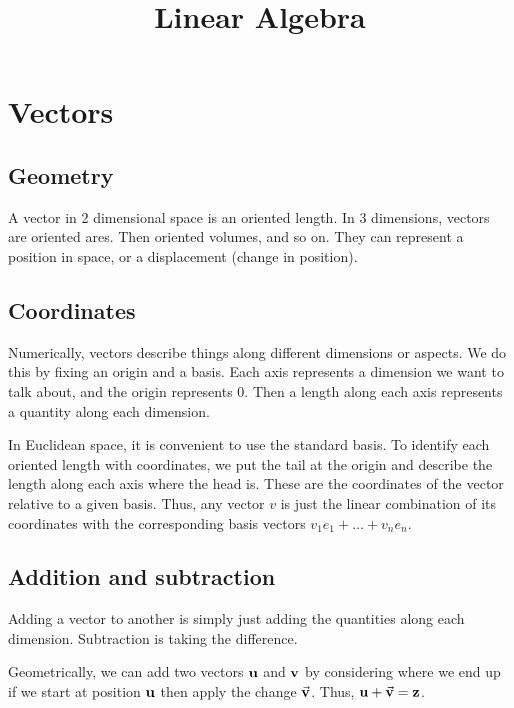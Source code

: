 \documentclass[../main.tex]{subfiles}
\title{Linear Algebra}
\author{}
\date{}
\begin{document}
\maketitle
\tableofcontents

\newpage

\section{Vectors}

\subsection{Geometry}

A vector in 2 dimensional space is an oriented length.
In 3 dimensions, vectors are oriented ares.
Then oriented volumes, and so on.
They can represent a position in space, or a displacement (change in position).

\subsection{Coordinates}

Numerically, vectors describe things along different dimensions or aspects.
We do this by fixing an origin and a basis.
Each axis represents a dimension we want to talk about,
and the origin represents 0.
Then a length along each axis represents a quantity along each dimension.

In Euclidean space, it is convenient to use the standard basis.
To identify each oriented length with coordinates,
we put the tail at the origin and describe the length along each axis where the head is.
These are the coordinates of the vector relative to a given basis.
Thus,
any vector \( v \) is just the linear combination of its coordinates
with the corresponding basis vectors
\( v_1 e_1 + \dots + v_n e_n \).

\noindent


\subsection{Addition and subtraction}

Adding a vector to another is simply just adding the quantities along each dimension.
Subtraction is taking the difference.

Geometrically, we can add two vectors \( \vb{u} \) and \( \vb{v} \)
by considering where we end up if we start at position \( \vb{u} \)
then apply the change \( \va{v} \).
Thus, \( \vb{u} + \va{v} = \vb{z} \).
\end{document}
